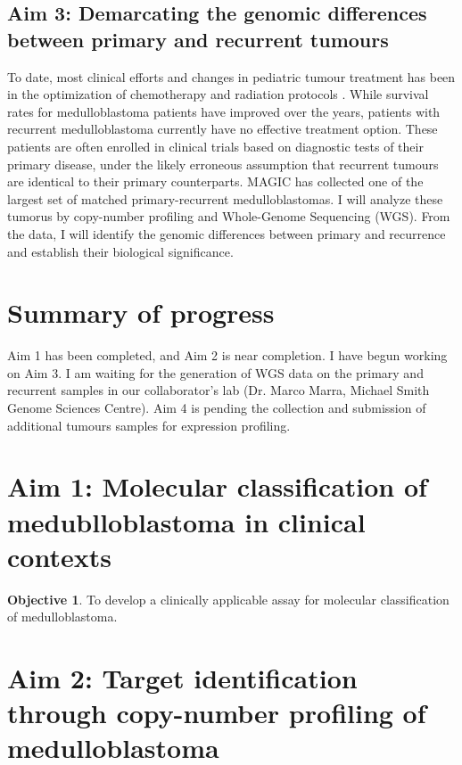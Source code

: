 \documentclass[11pt,letterpaper]{article}
\theoremstyle{definition}
\newtheorem*{objective}{Objective}
\begin{document}
\subsection{Aim 3: Demarcating the genomic differences between primary and recurrent tumours}

To date, most clinical efforts and changes in pediatric tumour treatment has been in the optimization of chemotherapy and radiation protocols . While survival rates for medulloblastoma patients have improved over the years, patients with recurrent medulloblastoma currently have no effective treatment option. These patients are often enrolled in clinical trials based on diagnostic tests of their primary disease, under the likely erroneous assumption that recurrent tumours are identical to their primary counterparts. MAGIC has collected one of the largest set of matched primary-recurrent medulloblastomas. I will analyze these tumorus by copy-number profiling and Whole-Genome Sequencing (WGS). From the data, I will identify the genomic differences between primary and recurrence and establish their biological significance.


\section{Summary of progress}

Aim 1 has been completed, and Aim 2 is near completion.
I have begun working on Aim 3. I am waiting for the generation of WGS data on the primary and recurrent samples in our collaborator's lab (Dr. Marco Marra, Michael Smith Genome Sciences Centre).
Aim 4 is pending the collection and submission of additional tumours samples for expression profiling.


\section{Aim 1: Molecular classification of medublloblastoma in clinical contexts}

\begin{objective}
To develop a clinically applicable assay for molecular classification of medulloblastoma.
\end{objective}




\section{Aim 2: Target identification through copy-number profiling of medulloblastoma}
\end{document}
